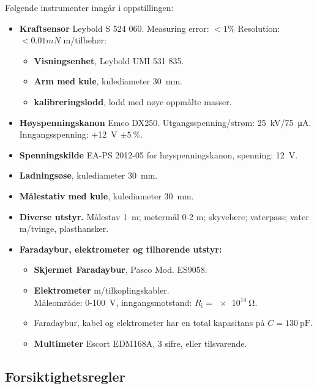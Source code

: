 \documentclass[../Elmag-labhefte-2020.tex]{subfiles}
\begin{document}
\begin{itemize}
Følgende instrumenter inngår i oppstillingen:
\vspace{-4mm} 
\begin{itemize}
    \item \textbf{Kraftsensor} Leybold S  524 060. Measuring error: $< 1\%$
Resolution: $< 0.01 mN$ 
    m/tilbehør:
    \vspace{-2mm} 
    \begin{itemize}
        \item \textbf{Visningsenhet}, Leybold UMI 531 835.
        \item \textbf{Arm med kule}, kulediameter \SI{30}{\milli\m}.
        \item \textbf{kalibreringslodd}, lodd med nøye oppmålte masser.
    \end{itemize}
    \item \textbf{Høyspenningskanon} Emco DX250. Utgangsspenning/strøm: \SI{25}{\kilo\volt}/\SI{75}{\micro\ampere}. Inngangsspenning: +\SI{12}{\volt} $\pm \SI{5}{\percent}$.
    \item \textbf{Spenningskilde}  EA-PS 2012-05 for høyspenningskanon, spenning: \SI{12}{\volt}.
    \item \textbf{Ladningsøse}, kulediameter \SI{30}{\milli\m}.
    \item \textbf{Målestativ med kule}, kulediameter \SI{30}{\milli\m}.
    \item \textbf{Diverse utstyr.} Målestav \SI{1}{\m}; metermål 0-2 \si{\m}; skyvelære; vaterpass; vater m/tvinge, plasthansker.
    \item \textbf{Faradaybur, elektrometer og tilhørende utstyr:}
    \vspace{-2mm}
    \begin{itemize}
        \item \textbf{Skjermet Faradaybur}, Pasco Mod. ES9058.
        \item \textbf{Elektrometer} m/tilkoplingskabler. \\
              Måleområde: 0-\SI{100}{\volt}, inngangsmotstand: $R_\text{i} = \SI{e14}{\ohm}$. 
        \item Faradaybur, kabel og elektrometer har en total kapasitans på $C = \SI{130}{\pico\farad}$. 
        \item \textbf{Multimeter} Escort EDM168A, 3 sifre, eller tilsvarende. 
    \end{itemize}
\end{itemize}

\subsection{Forsiktighetsregler}


\end{itemize}
\end{document}
